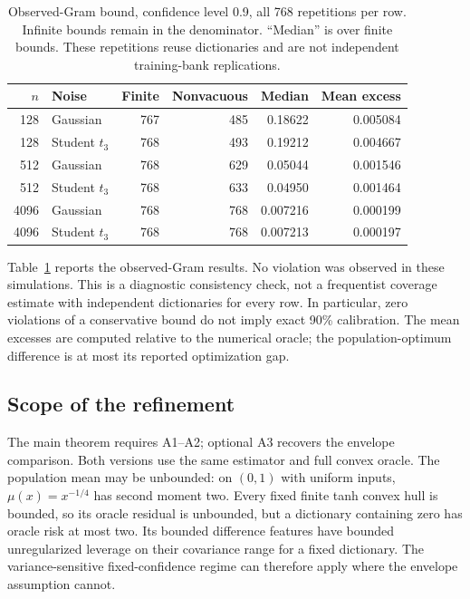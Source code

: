 \documentclass[pdflatex,sn-mathphys-ay]{sn-jnl}
\theoremstyle{remark}\newtheorem{remark}[theorem]{Remark}
\begin{document}
\begin{table}[htbp]\centering\small
\caption{Observed-Gram bound, confidence level 0.9, all 768 repetitions per row. Infinite bounds remain in the denominator. ``Median'' is over finite bounds. These repetitions reuse dictionaries and are not independent training-bank replications.}\label{tab:observedscore}
\begin{tabular}{rlrrrr}\toprule
$n$ & Noise & Finite & Nonvacuous & Median & Mean excess\\\midrule
128 & Gaussian & 767 & 485 & 0.18622 & 0.005084\\
128 & Student $t_3$ & 768 & 493 & 0.19212 & 0.004667\\
512 & Gaussian & 768 & 629 & 0.05044 & 0.001546\\
512 & Student $t_3$ & 768 & 633 & 0.04950 & 0.001464\\
4096 & Gaussian & 768 & 768 & 0.007216 & 0.000199\\
4096 & Student $t_3$ & 768 & 768 & 0.007213 & 0.000197\\\bottomrule
\end{tabular}\end{table}

Table~\ref{tab:observedscore} reports the observed-Gram results. No violation was observed in these simulations. This is a diagnostic consistency check, not a frequentist coverage estimate with independent dictionaries for every row. In particular, zero violations of a conservative bound do not imply exact 90\% calibration. The mean excesses are computed relative to the numerical oracle; the population-optimum difference is at most its reported optimization gap.

\subsection{Scope of the refinement}
The main theorem requires A1--A2; optional A3 recovers the envelope comparison. Both versions use the same estimator and full convex oracle. The population mean may be unbounded: on $(0,1)$ with uniform inputs, $\mu(x)=x^{-1/4}$ has second moment two. Every fixed finite tanh convex hull is bounded, so its oracle residual is unbounded, but a dictionary containing zero has oracle risk at most two. Its bounded difference features have bounded unregularized leverage on their covariance range for a fixed dictionary. The variance-sensitive fixed-confidence regime can therefore apply where the envelope assumption cannot.
\end{document}
